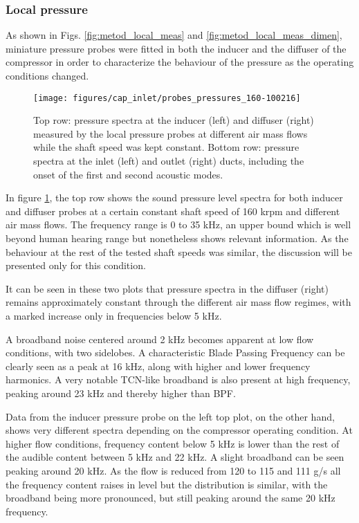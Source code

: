 \subsubsection{Local pressure}

As shown in Figs. \ref{fig:metod_local_meas} and \ref{fig:metod_local_meas_dimen}, miniature pressure probes were fitted in both the inducer and the diffuser of the compressor in order to characterize the behaviour of the pressure as the operating conditions changed.

\begin{figure}[thb!]
\hspace{-0.08\textwidth}
\texttt{[image: figures/cap\_inlet/probes\_pressures\_160-100216]}
\caption[Pressure spectra from probes and duct sensors]{Top row: pressure spectra at the inducer (left) and diffuser (right) measured by the local pressure probes at different air mass flows while the shaft speed was kept constant. Bottom row: pressure spectra at the inlet (left) and outlet (right) ducts, including the onset of the first and second acoustic modes.}
\label{fig:probes_all}
\end{figure}

In figure \ref{fig:probes_all}, the top row shows the sound pressure level spectra for both inducer and diffuser probes at a certain constant shaft speed of 160 krpm and different air mass flows. The frequency range is 0 to 35 kHz, an upper bound which is well beyond human hearing range but nonetheless shows relevant information. As the behaviour at the rest of the tested shaft speeds was similar, the discussion will be presented only for this condition.

It can be seen in these two plots that pressure spectra in the diffuser (right) remains approximately constant through the different air mass flow regimes, with a marked increase only in frequencies below 5 kHz.

A broadband noise centered around 2 kHz becomes apparent at low flow conditions, with two sidelobes. A characteristic Blade Passing Frequency can be clearly seen as a peak at 16 kHz, along with higher and lower frequency harmonics. A very notable TCN-like broadband is also present at high frequency, peaking around 23 kHz and thereby higher than BPF. 

Data from the inducer pressure probe on the left top plot, on the other hand, shows very different spectra depending on the compressor operating condition. At higher flow conditions, frequency content below 5 kHz is lower than the rest of the audible content between 5 kHz and 22 kHz. A slight broadband can be seen peaking around 20 kHz. As the flow is reduced from 120 to 115 and 111 g/s all the frequency content raises in level but the distribution is similar, with the broadband being more pronounced, but still peaking around the same 20 kHz frequency.

